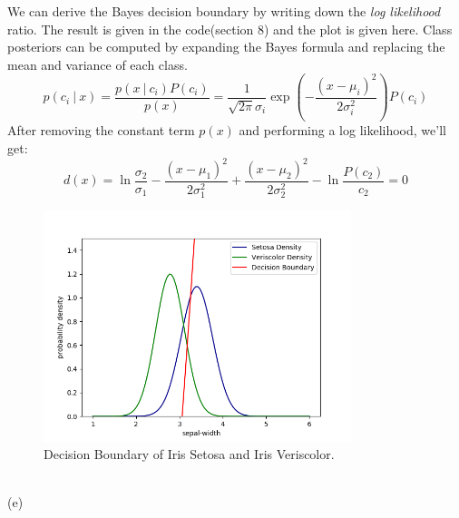 \documentclass[12pt]{article}
\numberwithin{equation}{section}
\numberwithin{table}{section}
\numberwithin{figure}{section}
\begin{document}
\newpage
We can derive the Bayes decision boundary by writing down the \textit{log likelihood} ratio. The result is given in the code(section 8) and the plot is given here. Class posteriors can be computed by expanding the Bayes formula and replacing the mean and variance of each class.
$$
	p(c_i\ |\ x) = \frac{p(x\ |\ c_i)P(c_i)}{p(x)} = \frac{1}{\sqrt{2\pi}\sigma_i}\exp(-\frac{(x - \mu_i)^2}{2\sigma_i^2})P(c_i)
$$
After removing the constant term $p(x)$ and performing a log likelihood, we'll get:
$$
	d(x) = \ln\frac{\sigma_2}{\sigma_1} - \frac{(x-\mu_1)^2}{2\sigma_1^2} + \frac{(x-\mu_2)^2}{2\sigma_2^2} - \ln\frac{P(c_2)}{c_2} = 0
$$
\begin{figure}[!h]\centering
	\includegraphics[width=0.8\textwidth]{8_4.png}
	\caption{Decision Boundary of Iris Setosa and Iris Veriscolor.}
	\label{pl8_4}
\end{figure}\\

(e) 
\end{document}
